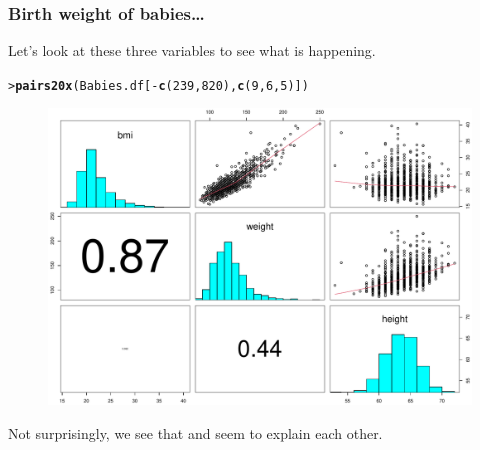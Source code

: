 \documentclass{beamer}\usepackage[]{graphicx}\usepackage[]{xcolor}
\makeatletter
\newcommand{\hlnum}[1]{\textcolor[rgb]{0.686,0.059,0.569}{#1}}%
\newcommand{\hlopt}[1]{\textcolor[rgb]{0,0,0}{#1}}%
\newcommand{\hlstd}[1]{\textcolor[rgb]{0.345,0.345,0.345}{#1}}%
\newcommand{\hlkwd}[1]{\textcolor[rgb]{0.737,0.353,0.396}{\textbf{#1}}}%
\newenvironment{kframe}{%
 \def\at@end@of@kframe{}%
 \ifinner\ifhmode%
  \def\at@end@of@kframe{\end{minipage}}%
  \begin{minipage}{\columnwidth}%
 \fi\fi%
 \def\FrameCommand##1{\hskip\@totalleftmargin \hskip-\fboxsep
 \colorbox{shadecolor}{##1}\hskip-\fboxsep
     \hskip-\linewidth \hskip-\@totalleftmargin \hskip\columnwidth}%
 \MakeFramed {\advance\hsize-\width
   \@totalleftmargin\z@ \linewidth\hsize
   \@setminipage}}%
 {\par\unskip\endMakeFramed%
 \at@end@of@kframe}
\newenvironment{knitrout}{}{} %
\makeatother
\begin{document}
\begin{frame}[fragile]
\frametitle{Birth weight of babies\ldots}
Let's look at these three variables to see what is happening.
\begin{knitrout}\scriptsize
{}\color{fgcolor}\begin{kframe}
\begin{alltt}
\hlstd{> }\hlkwd{pairs20x}\hlstd{(Babies.df[}\hlopt{-}\hlkwd{c}\hlstd{(}\hlnum{239}\hlstd{,}\hlnum{820}\hlstd{),} \hlkwd{c}\hlstd{(}\hlnum{9}\hlstd{,}\hlnum{6}\hlstd{,}\hlnum{5}\hlstd{)])}
\end{alltt}
\end{kframe}
\end{knitrout}



\begin{figure}
  \centering
  \includegraphics[scale = 0.35]{figure/RC-H10-042}
\end{figure}

Not surprisingly, we see that  and  seem to explain each other.
\end{frame}
\end{document}
